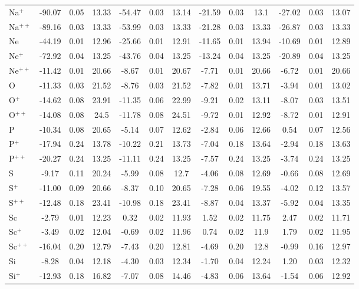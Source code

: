 \begin{longtable}{l!{\vrule width 0.25pt}ccc!{\vrule width 0.25pt}ccc!{\vrule width 0.25pt}ccc!{\vrule width 0.25pt}ccc}
Na$^+$ & -90.07 & 0.05 & 13.33 & -54.47 & 0.03 & 13.14 & -21.59 & 0.03 & 13.1 & -27.02 & 0.03 & 13.07 \\
Na$^{++}$ & -89.16 & 0.03 & 13.33 & -53.99 & 0.03 & 13.33 & -21.28 & 0.03 & 13.33 & -26.87 & 0.03 & 13.33 \\
Ne & -44.19 & 0.01 & 12.96 & -25.66 & 0.01 & 12.91 & -11.65 & 0.01 & 13.94 & -10.69 & 0.01 & 12.89 \\
Ne$^+$ & -72.92 & 0.04 & 13.25 & -43.76 & 0.04 & 13.25 & -13.24 & 0.04 & 13.25 & -20.89 & 0.04 & 13.25 \\
Ne$^{++}$ & -11.42 & 0.01 & 20.66 & -8.67 & 0.01 & 20.67 & -7.71 & 0.01 & 20.66 & -6.72 & 0.01 & 20.66 \\
O & -11.33 & 0.03 & 21.52 & -8.76 & 0.03 & 21.52 & -7.82 & 0.01 & 13.71 & -3.94 & 0.01 & 13.02 \\
O$^+$ & -14.62 & 0.08 & 23.91 & -11.35 & 0.06 & 22.99 & -9.21 & 0.02 & 13.11 & -8.07 & 0.03 & 13.51 \\
O$^{++}$ & -14.08 & 0.08 & 24.5 & -11.78 & 0.08 & 24.51 & -9.72 & 0.01 & 12.92 & -8.72 & 0.01 & 12.91 \\
P & -10.34 & 0.08 & 20.65 & -5.14 & 0.07 & 12.62 & -2.84 & 0.06 & 12.66 & 0.54 & 0.07 & 12.56 \\
P$^+$ & -17.94 & 0.24 & 13.78 & -10.22 & 0.21 & 13.73 & -7.04 & 0.18 & 13.64 & -2.94 & 0.18 & 13.63 \\
P$^{++}$ & -20.27 & 0.24 & 13.25 & -11.11 & 0.24 & 13.25 & -7.57 & 0.24 & 13.25 & -3.74 & 0.24 & 13.25 \\
S & -9.17 & 0.11 & 20.24 & -5.99 & 0.08 & 12.7 & -4.06 & 0.08 & 12.69 & -0.66 & 0.08 & 12.69 \\
S$^+$ & -11.00 & 0.09 & 20.66 & -8.37 & 0.10 & 20.65 & -7.28 & 0.06 & 19.55 & -4.02 & 0.12 & 13.57 \\
S$^{++}$ & -12.48 & 0.18 & 23.41 & -10.98 & 0.18 & 23.41 & -8.87 & 0.04 & 13.37 & -5.92 & 0.04 & 13.35 \\
Sc & -2.79 & 0.01 & 12.23 & 0.32 & 0.02 & 11.93 & 1.52 & 0.02 & 11.75 & 2.47 & 0.02 & 11.71 \\
Sc$^+$ & -3.49 & 0.02 & 12.04 & -0.69 & 0.02 & 11.96 & 0.74 & 0.02 & 11.9 & 1.79 & 0.02 & 11.95 \\
Sc$^{++}$ & -16.04 & 0.20 & 12.79 & -7.43 & 0.20 & 12.81 & -4.69 & 0.20 & 12.8 & -0.99 & 0.16 & 12.97 \\
Si & -8.28 & 0.04 & 12.18 & -4.30 & 0.03 & 12.34 & -1.70 & 0.04 & 12.24 & 1.20 & 0.03 & 12.32 \\
Si$^+$ & -12.93 & 0.18 & 16.82 & -7.07 & 0.08 & 14.46 & -4.83 & 0.06 & 13.64 & -1.54 & 0.06 & 12.92 \\

\end{longtable}
